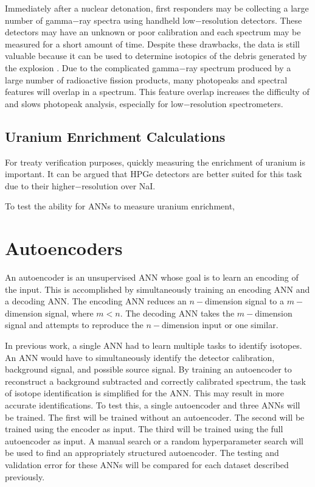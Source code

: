 \documentclass[tocnosub,noragright,centerchapter,12pt,fullpage]{uiucecethesis09}
\begin{document}
Immediately after a nuclear detonation, first responders may be collecting a large number of gamma$-$ray spectra using handheld low$-$resolution detectors. These detectors may have an unknown or poor calibration and each spectrum may be measured for a short amount of time. Despite these drawbacks, the data is still valuable because it can be used to determine isotopics of the debris generated by the explosion \cite{Moody}. Due to the complicated gamma$-$ray spectrum produced by a large number of radioactive fission products, many photopeaks and spectral features will overlap in a spectrum. This feature overlap increases the difficulty of and slows photopeak analysis, especially for low$-$resolution spectrometers. 

\subsection{Uranium Enrichment Calculations}

For treaty verification purposes, quickly measuring the enrichment of uranium is important. It can be argued that HPGe detectors are better suited for this task due to their higher$-$resolution over NaI. 

To test the ability for ANNs to measure uranium enrichment, 





\section{Autoencoders}


An autoencoder is an unsupervised ANN whose goal is to learn an encoding of the input. This is accomplished by simultaneously training an encoding ANN and a decoding ANN. The encoding ANN reduces an $n-$dimension signal to a $m-$dimension signal, where $m < n$. The decoding ANN takes the $m-$dimension signal and attempts to reproduce the $n-$dimension input or one similar.

In previous work, a single ANN had to learn multiple tasks to identify isotopes. An ANN would have to simultaneously identify the detector calibration, background signal, and possible source signal. By training an autoencoder to reconstruct a background subtracted and correctly calibrated spectrum, the task of isotope identification is simplified for the ANN. This may result in more accurate identifications. To test this, a single autoencoder and three ANNs will be trained. The first will be trained without an autoencoder. The second will be trained using the encoder as input. The third will be trained using the full autoencoder as input. A manual search or a random hyperparameter search will be used to find an appropriately structured autoencoder. The testing and validation error for these ANNs will be compared for each dataset described previously.
\end{document}

